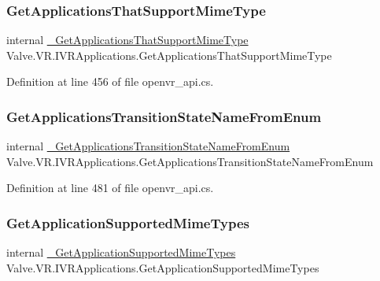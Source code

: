 \subsubsection{\texorpdfstring{GetApplicationsThatSupportMimeType}{GetApplicationsThatSupportMimeType}}
{\footnotesize\ttfamily internal \mbox{\hyperlink{struct_valve_1_1_v_r_1_1_i_v_r_applications_a69203996ca75bee54e6ff4b68d774618}{\+\_\+\+Get\+Applications\+That\+Support\+Mime\+Type}} Valve.\+V\+R.\+I\+V\+R\+Applications.\+Get\+Applications\+That\+Support\+Mime\+Type}



Definition at line 456 of file openvr\+\_\+api.\+cs.

\mbox{\label{struct_valve_1_1_v_r_1_1_i_v_r_applications_a7e6256dba191f4e0b7aa81093bffbff4}} 
\subsubsection{\texorpdfstring{GetApplicationsTransitionStateNameFromEnum}{GetApplicationsTransitionStateNameFromEnum}}
{\footnotesize\ttfamily internal \mbox{\hyperlink{struct_valve_1_1_v_r_1_1_i_v_r_applications_a84090171964167a37149043d7834077b}{\+\_\+\+Get\+Applications\+Transition\+State\+Name\+From\+Enum}} Valve.\+V\+R.\+I\+V\+R\+Applications.\+Get\+Applications\+Transition\+State\+Name\+From\+Enum}



Definition at line 481 of file openvr\+\_\+api.\+cs.

\mbox{\label{struct_valve_1_1_v_r_1_1_i_v_r_applications_ae283807d74221cb190c96b05508ad842}} 
\subsubsection{\texorpdfstring{GetApplicationSupportedMimeTypes}{GetApplicationSupportedMimeTypes}}
{\footnotesize\ttfamily internal \mbox{\hyperlink{struct_valve_1_1_v_r_1_1_i_v_r_applications_a0c1a0f078e0bd30ada05dccc30aaa3b9}{\+\_\+\+Get\+Application\+Supported\+Mime\+Types}} Valve.\+V\+R.\+I\+V\+R\+Applications.\+Get\+Application\+Supported\+Mime\+Types}



